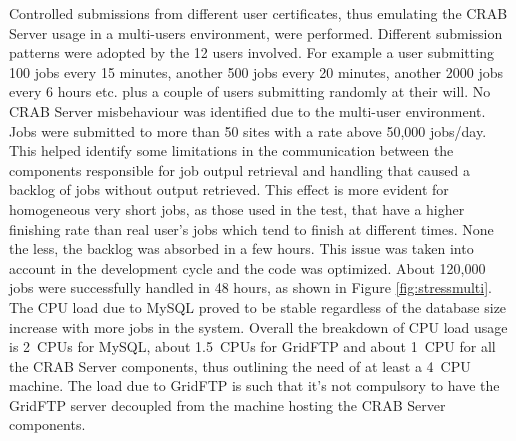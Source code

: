 Controlled submissions from different user certificates, thus 
emulating the CRAB Server usage in a multi-users environment, were performed.
Different submission patterns were adopted by the 12 users
involved. For example a user submitting 100 jobs every 15 minutes,
another 500 jobs every 20 minutes, another 2000 jobs every 6 hours
etc. plus a couple of users submitting randomly at their will.  No
CRAB Server misbehaviour was identified due to the multi-user
environment. %
Jobs were submitted to more than 50 sites with a rate above 50,000 jobs/day.
This helped identify some limitations in the communication between 
the components responsible for job outpul retrieval and handling that caused a backlog of jobs without output retrieved. This effect is more evident for homogeneous very short
jobs, as those used in the test, that have a higher finishing rate
than real user's jobs which tend to finish at different times. None
the less, the backlog was absorbed in a few hours. This issue was
taken into account in the development cycle and the code was
optimized.  About 120,000 jobs were successfully handled in 48 hours,
as shown in Figure \ref{fig:stressmulti}.  The CPU load due to MySQL
proved to be stable regardless of the database size increase with more
jobs in the system. Overall the breakdown of CPU load usage is 2~CPUs
for MySQL, about 1.5~CPUs for GridFTP and about 1~CPU for all the CRAB
Server components, thus outlining the need of at least a 4~CPU
machine.  The load due to GridFTP is such that it's not compulsory to
have the GridFTP server decoupled from the machine hosting the CRAB
Server components.

